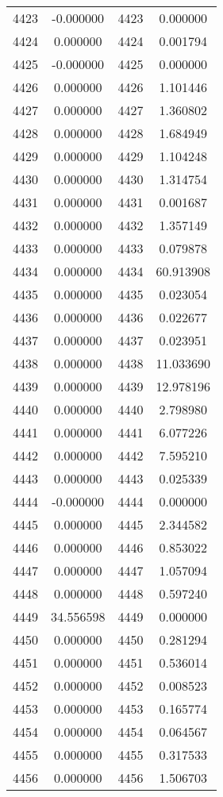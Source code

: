 \documentclass[12pt]{article}
\begin{document}
\begin{longtable}{@{}cccc@{}}
4423 & -0.000000 & 4423 & 0.000000 \\
4424 & 0.000000 & 4424 & 0.001794 \\
4425 & -0.000000 & 4425 & 0.000000 \\
4426 & 0.000000 & 4426 & 1.101446 \\
4427 & 0.000000 & 4427 & 1.360802 \\
4428 & 0.000000 & 4428 & 1.684949 \\
4429 & 0.000000 & 4429 & 1.104248 \\
4430 & 0.000000 & 4430 & 1.314754 \\
4431 & 0.000000 & 4431 & 0.001687 \\
4432 & 0.000000 & 4432 & 1.357149 \\
4433 & 0.000000 & 4433 & 0.079878 \\
4434 & 0.000000 & 4434 & 60.913908 \\
4435 & 0.000000 & 4435 & 0.023054 \\
4436 & 0.000000 & 4436 & 0.022677 \\
4437 & 0.000000 & 4437 & 0.023951 \\
4438 & 0.000000 & 4438 & 11.033690 \\
4439 & 0.000000 & 4439 & 12.978196 \\
4440 & 0.000000 & 4440 & 2.798980 \\
4441 & 0.000000 & 4441 & 6.077226 \\
4442 & 0.000000 & 4442 & 7.595210 \\
4443 & 0.000000 & 4443 & 0.025339 \\
4444 & -0.000000 & 4444 & 0.000000 \\
4445 & 0.000000 & 4445 & 2.344582 \\
4446 & 0.000000 & 4446 & 0.853022 \\
4447 & 0.000000 & 4447 & 1.057094 \\
4448 & 0.000000 & 4448 & 0.597240 \\
4449 & 34.556598 & 4449 & 0.000000 \\
4450 & 0.000000 & 4450 & 0.281294 \\
4451 & 0.000000 & 4451 & 0.536014 \\
4452 & 0.000000 & 4452 & 0.008523 \\
4453 & 0.000000 & 4453 & 0.165774 \\
4454 & 0.000000 & 4454 & 0.064567 \\
4455 & 0.000000 & 4455 & 0.317533 \\
4456 & 0.000000 & 4456 & 1.506703 \\

\end{longtable}
\end{document}
